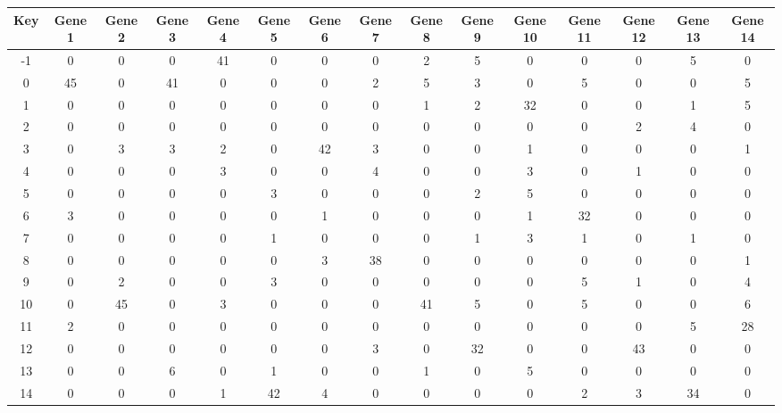 \begin{tabular}{|c|c|c|c|c|c|c|c|c|c|c|c|c|c|c|}
\hline
Key & Gene 1 & Gene 2 & Gene 3 & Gene 4 & Gene 5 & Gene 6 & Gene 7 & Gene 8 & Gene 9 & Gene 10 & Gene 11 & Gene 12 & Gene 13 & Gene 14 \\
\hline
-1 & 0 & 0 & 0 & 41 & 0 & 0 & 0 & 2 & 5 & 0 & 0 & 0 & 5 & 0 \\
0 & 45 & 0 & 41 & 0 & 0 & 0 & 2 & 5 & 3 & 0 & 5 & 0 & 0 & 5 \\
1 & 0 & 0 & 0 & 0 & 0 & 0 & 0 & 1 & 2 & 32 & 0 & 0 & 1 & 5 \\
2 & 0 & 0 & 0 & 0 & 0 & 0 & 0 & 0 & 0 & 0 & 0 & 2 & 4 & 0 \\
3 & 0 & 3 & 3 & 2 & 0 & 42 & 3 & 0 & 0 & 1 & 0 & 0 & 0 & 1 \\
4 & 0 & 0 & 0 & 3 & 0 & 0 & 4 & 0 & 0 & 3 & 0 & 1 & 0 & 0 \\
5 & 0 & 0 & 0 & 0 & 3 & 0 & 0 & 0 & 2 & 5 & 0 & 0 & 0 & 0 \\
6 & 3 & 0 & 0 & 0 & 0 & 1 & 0 & 0 & 0 & 1 & 32 & 0 & 0 & 0 \\
7 & 0 & 0 & 0 & 0 & 1 & 0 & 0 & 0 & 1 & 3 & 1 & 0 & 1 & 0 \\
8 & 0 & 0 & 0 & 0 & 0 & 3 & 38 & 0 & 0 & 0 & 0 & 0 & 0 & 1 \\
9 & 0 & 2 & 0 & 0 & 3 & 0 & 0 & 0 & 0 & 0 & 5 & 1 & 0 & 4 \\
10 & 0 & 45 & 0 & 3 & 0 & 0 & 0 & 41 & 5 & 0 & 5 & 0 & 0 & 6 \\
11 & 2 & 0 & 0 & 0 & 0 & 0 & 0 & 0 & 0 & 0 & 0 & 0 & 5 & 28 \\
12 & 0 & 0 & 0 & 0 & 0 & 0 & 3 & 0 & 32 & 0 & 0 & 43 & 0 & 0 \\
13 & 0 & 0 & 6 & 0 & 1 & 0 & 0 & 1 & 0 & 5 & 0 & 0 & 0 & 0 \\
14 & 0 & 0 & 0 & 1 & 42 & 4 & 0 & 0 & 0 & 0 & 2 & 3 & 34 & 0 \\
\hline
\end{tabular}